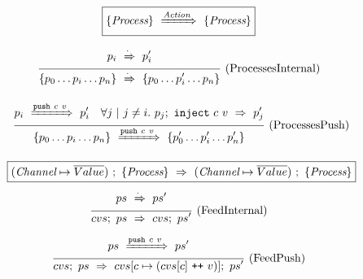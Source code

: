 
\begin{figure}

$$
  \boxed{\{ \textit{Process} \}~\xRightarrow{\textit{Action}}~\{ \textit{Process} \}}
$$

$$
\ruleIN{
  \ProcShake{p_i}{\cdot}{p'_i}
}{
  \ProcsShake{
    \sgl{p_0 \ldots p_i \ldots p_n}
  }{\cdot}{
    \sgl{p_0 \ldots p'_i \ldots p_n}
  }
}{ProcessesInternal}
$$

$$
\ruleIN{
  \ProcShake{p_i}{\Push~c~v}{p'_i}
  \quad
  \forall j~|~j \neq i.~
  \ProcInject{p_j}{c}{v}{p'_j}
}{
  \ProcsShake{
    \sgl{p_0 \ldots p_i \ldots p_n}
  }{\Push~c~v}{
    \sgl{p'_0 \ldots p'_i \ldots p'_n}
  }
}{ProcessesPush}
$$


\vspace{2em}

\newcommand\vs {\ti{vs}}
\newcommand\accs {\ti{accs}}
\newcommand\network {\ti{ps}}

$$
  \boxed{
    (\textit{Channel} \mapsto \overline{Value})~;~\{ \textit{Process} \}~\Rightarrow~(\textit{Channel} \mapsto \overline{Value})~;~\{ \textit{Process} \}
  }
$$
$$
\enskip \frac {\displaystyle 
  ps~\xRightarrow{\cdot}~ps'
} {\displaystyle 
  cvs;~ps~\Rightarrow~cvs;~ps'
} \  \mbox{(FeedInternal)} \enskip
$$








$$
\enskip \frac {\displaystyle 
  ps~\xRightarrow{\texttt{push}~c~v}~ps'
} {\displaystyle 
  cvs;~ps~\Rightarrow~cvs[c \mapsto (cvs[c] ~\texttt{++}~ v)];~ps'
} \  \mbox{(FeedPush)} \enskip
$$





\end{figure}
